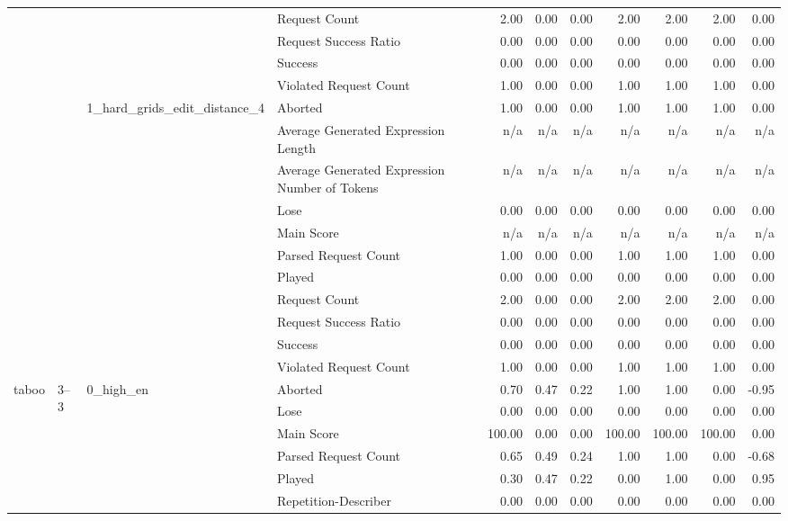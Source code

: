 \begin{tabular}{llllrrrrrrr}
 &  &  & Request Count & 2.00 & 0.00 & 0.00 & 2.00 & 2.00 & 2.00 & 0.00 \\
 &  &  & Request Success Ratio & 0.00 & 0.00 & 0.00 & 0.00 & 0.00 & 0.00 & 0.00 \\
 &  &  & Success & 0.00 & 0.00 & 0.00 & 0.00 & 0.00 & 0.00 & 0.00 \\
 &  &  & Violated Request Count & 1.00 & 0.00 & 0.00 & 1.00 & 1.00 & 1.00 & 0.00 \\
\cline{3-11}
 &  & \multirow[t]{11}{*}{1_hard_grids_edit_distance_4} & Aborted & 1.00 & 0.00 & 0.00 & 1.00 & 1.00 & 1.00 & 0.00 \\
 &  &  & Average Generated Expression Length & n/a & n/a & n/a & n/a & n/a & n/a & n/a \\
 &  &  & Average Generated Expression Number of Tokens & n/a & n/a & n/a & n/a & n/a & n/a & n/a \\
 &  &  & Lose & 0.00 & 0.00 & 0.00 & 0.00 & 0.00 & 0.00 & 0.00 \\
 &  &  & Main Score & n/a & n/a & n/a & n/a & n/a & n/a & n/a \\
 &  &  & Parsed Request Count & 1.00 & 0.00 & 0.00 & 1.00 & 1.00 & 1.00 & 0.00 \\
 &  &  & Played & 0.00 & 0.00 & 0.00 & 0.00 & 0.00 & 0.00 & 0.00 \\
 &  &  & Request Count & 2.00 & 0.00 & 0.00 & 2.00 & 2.00 & 2.00 & 0.00 \\
 &  &  & Request Success Ratio & 0.00 & 0.00 & 0.00 & 0.00 & 0.00 & 0.00 & 0.00 \\
 &  &  & Success & 0.00 & 0.00 & 0.00 & 0.00 & 0.00 & 0.00 & 0.00 \\
 &  &  & Violated Request Count & 1.00 & 0.00 & 0.00 & 1.00 & 1.00 & 1.00 & 0.00 \\
\cline{1-11} \cline{2-11} \cline{3-11}
\multirow[t]{363}{*}{taboo} & \multirow[t]{33}{*}{3--3} & \multirow[t]{11}{*}{0_high_en} & Aborted & 0.70 & 0.47 & 0.22 & 1.00 & 1.00 & 0.00 & -0.95 \\
 &  &  & Lose & 0.00 & 0.00 & 0.00 & 0.00 & 0.00 & 0.00 & 0.00 \\
 &  &  & Main Score & 100.00 & 0.00 & 0.00 & 100.00 & 100.00 & 100.00 & 0.00 \\
 &  &  & Parsed Request Count & 0.65 & 0.49 & 0.24 & 1.00 & 1.00 & 0.00 & -0.68 \\
 &  &  & Played & 0.30 & 0.47 & 0.22 & 0.00 & 1.00 & 0.00 & 0.95 \\
 &  &  & Repetition-Describer & 0.00 & 0.00 & 0.00 & 0.00 & 0.00 & 0.00 & 0.00 \\

\end{tabular}

